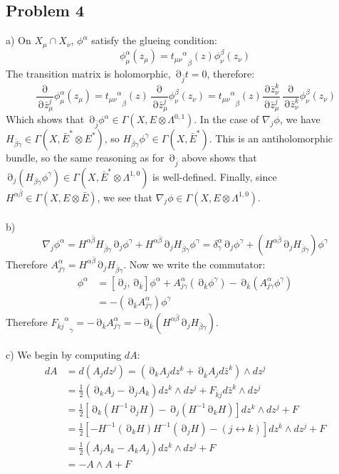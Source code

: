 \documentclass[12 pt]{article}
\DeclareMathOperator {\p} {\partial}
\theoremstyle{plain}
\theoremstyle{definition}
\theoremstyle{remark}
\begin{document}
\subsection*{Problem 4}
a) On $X_{\mu} \cap X_{\nu}$, $\phi^{\alpha}$ satisfy the glueing condition:
\[       \phi_{\mu}^{\alpha} (z_{\mu}) = {{t_{\mu \nu}}^{\alpha}}_{\beta} (z) \phi^{\beta}_{\nu} (z_{\nu})      \]
The transition matrix is holomorphic, $\p_{\bar j} t = 0$, therefore:
\[        \frac{\p}{\p \bar z^j_{\mu}} \phi^{\alpha}_{\mu} (z_{\mu}) = {{t_{\mu \nu}}^{\alpha}}_{\beta} (z)   \frac{\p}{\p \bar z^j_{ \mu}} \phi^{\beta}_{\nu} (z_{\nu}) =  {{t_{\mu \nu}}^{\alpha}}_{\beta} (z) \frac{\p \bar z^k_{ \nu}}{\p \bar z^j_{ \mu}} \frac{\p}{\p \bar z^k_{ \nu}} \phi^{\beta}_{\nu} (z_{\nu})   \]
Which shows that $\p_{\bar j} \phi^{\alpha} \in \Gamma(X, E\otimes \Lambda^{0,1})$. In the case of $\nabla_j \phi$, we have $H_{\bar \beta \gamma} \in \Gamma(X, \bar E^* \otimes E^*)$, so $H_{\bar \beta \gamma} \phi^{\gamma} \in \Gamma(X, \bar E^*)$. This is an antiholomorphic bundle, so the same reasoning as for $\p_{\bar j}$ above shows that $\p_j (H_{\bar \beta \gamma} \phi^{\gamma}) \in \Gamma(X, \bar E^* \otimes \Lambda^{1,0})$ is well-defined. Finally, since $H^{\alpha \bar \beta} \in \Gamma(X, E \otimes \bar E)$, we see that $\nabla_j \phi \in \Gamma(X, E \otimes \Lambda^{1,0})$.
\\
\\
b) \[      \nabla_j \phi^{\alpha} = H^{\alpha \bar \beta} H_{\bar \beta \gamma} \p_j \phi^{\gamma} + H^{\alpha \bar \beta} \p_j H_{\bar \beta \gamma} \phi^{\gamma}   = \delta^{\alpha}_{\gamma} \p_j \phi^{\gamma} + (H^{\alpha \bar \beta} \p_j H_{\bar \beta \gamma}) \phi^{\gamma}  \]
Therefore $A^{\alpha}_{j \gamma} = H^{\alpha \bar \beta} \p_j H_{\bar \beta \gamma}$. Now we write the commutator:
\begin{align*}     
  [\nabla_j , \nabla_{\bar k} ] \phi^{\alpha} &=  [\p_j , \p_{\bar k}] \phi^{\alpha} + A^{\alpha}_{j \gamma} (\p_{\bar k} \phi^{\gamma}) - \p_{\bar k} (A^{\alpha}_{j\gamma} \phi^{\gamma})  \\
&= - (\p_{\bar k} A^{\alpha}_{j \gamma}) \phi^{\gamma}
\end{align*}
Therefore ${{F_{\bar k j}}^{\alpha}}_{\gamma} = - \p_{\bar k} A^{\alpha}_{j \gamma} = - \p_{\bar k} (H^{\alpha \bar \beta} \p_j H_{\bar \beta \gamma}) $.
\\
\\
c) We begin by computing $dA$:
\begin{align*}        dA &= d(A_j dz^j) = (\p_k A_j dz^k + \p_{\bar k} A_j d \bar z^k) \wedge dz^j     \\
        &= \frac{1}{2} ( \p_k A_j - \p_j A_k) dz^k \wedge dz^j + F_{\bar k j} d \bar z^k \wedge dz^j     \\
         &= \frac{1}{2} [ \p_k (H^{-1} \p_j H) - \p_j (H^{-1} \p_k H)] dz^k \wedge dz^j + F          \\
        &=  \frac{1}{2}[ - H^{-1} (\p_k H) H^{-1}( \p_j H) - (j \leftrightarrow k) ] dz^k \wedge dz^j + F         \\
         &= \frac{1}{2} ( A_j A_k - A_k A_j) dz^k \wedge dz^j + F          \\
         &= - A \wedge A + F         
\end{align*}
\end{document}
